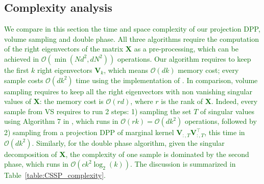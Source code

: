 \documentclass[twoside,11pt]{book}
\newcommand{\rev}[1]{\textcolor{darkgreen}{#1}}
\numberwithin{theorem}{chapter}
\numberwithin{definition}{chapter}
\numberwithin{proposition}{chapter}
\numberwithin{corollary}{chapter}
\numberwithin{example}{chapter}
\numberwithin{lemma}{chapter}
\numberwithin{assumption}{chapter}
\DeclareMathOperator{\Tran}{\intercal}
\begin{document}
\subsection{Complexity analysis}\label{sec:complexity}
\rev{We compare in this section the time and space complexity of our projection DPP, volume sampling and double phase.
All three algorithms require the computation of the right eigenvectors of the matrix $\bm{X}$ as a pre-processing, which can be achieved in $\mathcal{O}(\min(N d^{2},dN^{2}))$ operations.
Our algorithm requires to keep the first $k$ right eigenvectors $\bm{V}_{k}$, which means $\mathcal{O}(dk)$ memory cost; every sample costs $\mathcal{O}(dk^{2})$ time using the implementation of \cite{TrBaAm18}.}
\rev{In comparison, volume sampling requires to keep all the right eigenvectors with non vanishing singular values of $\bm{X}$: the memory cost is $\mathcal{O}(r d)$, where $r$ is the rank of $\bm{X}$.
Indeed, every sample from VS requires to run 2 steps: 1) sampling the set $T$ of singular values using Algorithm 7 in \citep{KuTa12}, which runs in $\mathcal{O}(rk) = \mathcal{O}(dk^{2})$ operations, followed by 2) sampling from a projection DPP of marginal kernel $\bm{V}_{:,T}^{\phantom{\Tran}}\bm{V}_{:,T}^{\Tran}$, this time in $\mathcal{O}(dk^{2})$.
%
Similarly, for the double phase algorithm, given the singular decomposition of $\bm{X}$, the complexity of one sample is dominated by the second phase, which runs in $\mathcal{O}(c k^{2} \log_{2}(k))$. The discussion is summarized in Table~\ref{table:CSSP_complexity}.}
\end{document}
